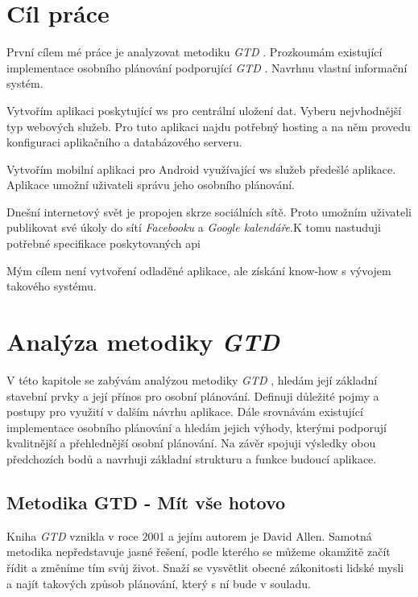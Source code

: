 \documentclass[thesis=B,czech]{FITthesis}[2012/06/26]
\newcommand{\GTD}{\textit{GTD }}
\begin{document}
\chapter{Cíl práce}

První cílem mé práce je analyzovat metodiku \GTD\cite{gtd}. Prozkoumám existující implementace osobního plánování podporující \GTD\cite{gtd}. Navrhnu vlastní informační systém.

Vytvořím aplikaci poskytující \acrshort{ws} pro centrální uložení dat. Vyberu nejvhodnější typ webových služeb. Pro tuto aplikaci najdu potřebný hosting a na něm provedu konfiguraci aplikačního a databázového serveru.

Vytvořím mobilní aplikaci pro Android využívající \acrshort{ws} služeb předešlé aplikace. Aplikace umožní uživateli správu jeho osobního plánování.

Dnešní internetový svět je propojen skrze sociálních sítě. Proto umožním uživateli publikovat své úkoly do sítí \textit{Facebooku} a \textit{Google kalendáře}.K tomu nastuduji potřebné specifikace poskytovaných \acrshort{api}  

Mým cílem není vytvoření odladěné aplikace, ale získání know-how s vývojem takového systému.
  
\chapter{Analýza metodiky \GTD}

V této kapitole se zabývám analýzou metodiky \GTD, hledám její základní stavební prvky a její přínos pro osobní plánování. Definuji důležité pojmy a postupy pro využití v dalším návrhu aplikace. 
Dále srovnávám existující implementace osobního plánování a hledám jejich výhody, kterými podporují kvalitnější a přehlednější osobní plánování.
Na závěr spojuji výsledky obou předchozích bodů a navrhuji základní strukturu a funkce budoucí aplikace.

\section{Metodika GTD - Mít vše hotovo}

Kniha \GTD\cite{gtd} vznikla v roce 2001 a jejím autorem je David Allen. Samotná metodika nepředstavuje jasné řešení, podle kterého se můžeme okamžitě začít řídit a změníme tím svůj život. Snaží se vysvětlit obecné zákonitosti lidské mysli a najít takových způsob plánování, který s ní bude v souladu.\\
\end{document}
